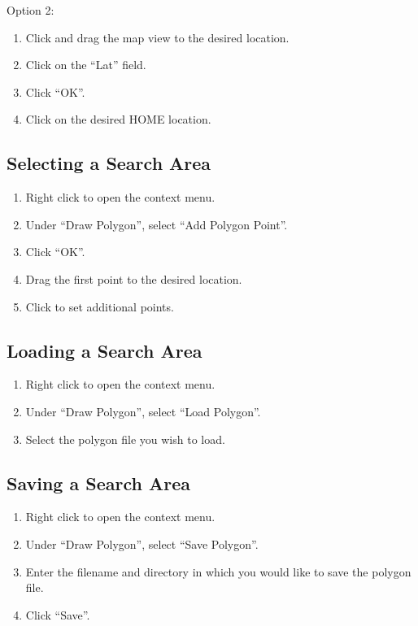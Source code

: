 \documentclass{report}
\begin{document}
			Option 2:
			\begin{enumerate}
				\item Click and drag the map view to the desired location.
				\item Click on the ``Lat'' field.
				\item Click ``OK''.
				\item Click on the desired HOME location.
			\end{enumerate}
		\subsection{Selecting a Search Area}
			\begin{enumerate}
				\item Right click to open the context menu.
				\item Under ``Draw Polygon'', select ``Add Polygon Point''.
				\item Click ``OK''.
				\item Drag the first point to the desired location.
				\item Click to set additional points.
			\end{enumerate}
		\subsection{Loading a Search Area}
			\begin{enumerate}
				\item Right click to open the context menu.
				\item Under ``Draw Polygon'', select ``Load Polygon''.
				\item Select the polygon file you wish to load.
			\end{enumerate}
		\subsection{Saving a Search Area}
			\begin{enumerate}
				\item Right click to open the context menu.
				\item Under ``Draw Polygon'', select ``Save Polygon''.
				\item Enter the filename and directory in which you would like to save the polygon file.
				\item Click ``Save''.
			\end{enumerate}
\end{document}
